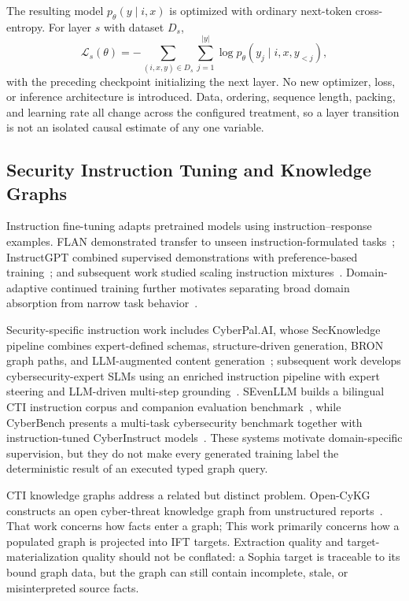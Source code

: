 \documentclass[conference]{IEEEtran}
\begin{document}
The resulting model $p_\theta(y\mid i,x)$ is optimized with ordinary next-token cross-entropy. For layer $s$ with dataset $D_s$,
\begin{equation}
 \mathcal{L}_s(\theta)=-\sum_{(i,x,y)\in D_s}\sum_{j=1}^{|y|}\log p_\theta(y_j\mid i,x,y_{<j}),
\end{equation}
with the preceding checkpoint initializing the next layer. No new optimizer, loss, or inference architecture is introduced. Data, ordering, sequence length, packing, and learning rate all change across the configured treatment, so a layer transition is not an isolated causal estimate of any one variable.

\subsection{Security Instruction Tuning and Knowledge Graphs}
Instruction fine-tuning adapts pretrained models using instruction--response examples. FLAN demonstrated transfer to unseen instruction-formulated tasks~\cite{wei2022flan}; InstructGPT combined supervised demonstrations with preference-based training~\cite{ouyang2022training}; and subsequent work studied scaling instruction mixtures~\cite{chung2024scaling}. Domain-adaptive continued training further motivates separating broad domain absorption from narrow task behavior~\cite{gururangan2020dont}.

Security-specific instruction work includes CyberPal.AI, whose SecKnowledge pipeline combines expert-defined schemas, structure-driven generation, BRON graph paths, and LLM-augmented content generation~\cite{levi2025cyberpal}; subsequent work develops cybersecurity-expert SLMs using an enriched instruction pipeline with expert steering and LLM-driven multi-step grounding~\cite{levi2025slm}. SEvenLLM builds a bilingual CTI instruction corpus and companion evaluation benchmark~\cite{ji2024sevenllm}, while CyberBench presents a multi-task cybersecurity benchmark together with instruction-tuned CyberInstruct models~\cite{liu2024cyberbench}. These systems motivate domain-specific supervision, but they do not make every generated training label the deterministic result of an executed typed graph query.

CTI knowledge graphs address a related but distinct problem. Open-CyKG constructs an open cyber-threat knowledge graph from unstructured reports~\cite{sarhan2021opencykg}. That work concerns how facts enter a graph; This work primarily concerns how a populated graph is projected into IFT targets. Extraction quality and target-materialization quality should not be conflated: a Sophia target is traceable to its bound graph data, but the graph can still contain incomplete, stale, or misinterpreted source facts.
\end{document}
